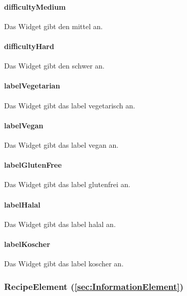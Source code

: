\documentclass[parskip=full]{scrartcl}
\begin{document}
\paragraph*{difficultyMedium} Das Widget gibt den  mittel an.
\paragraph*{difficultyHard} Das Widget gibt den  schwer an.
\paragraph*{labelVegetarian} Das Widget gibt das \gls{label} vegetarisch an.
\paragraph*{labelVegan} Das Widget gibt das \gls{label} vegan an.
\paragraph*{labelGlutenFree} Das Widget gibt das \gls{label} glutenfrei an.
\paragraph*{labelHalal} Das Widget gibt das \gls{label} halal an.
\paragraph*{labelKoscher} Das Widget gibt das \gls{label} koscher an.

\subsubsection*{RecipeElement (\ref{sec:InformationElement})}
\end{document}
